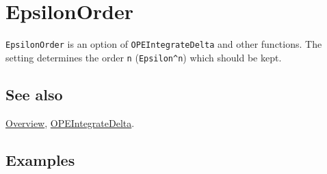 \documentclass[../FeynCalcManual.tex]{subfiles}
\begin{document}
\hypertarget{epsilonorder}{%
\section{EpsilonOrder}\label{epsilonorder}}

\texttt{EpsilonOrder} is an option of \texttt{OPEIntegrateDelta} and
other functions. The setting determines the order \texttt{n}
(\texttt{Epsilon^n}) which should be kept.

\subsection{See also}

\hyperlink{toc}{Overview},
\hyperlink{opeintegratedelta}{OPEIntegrateDelta}.

\subsection{Examples}
\end{document}
